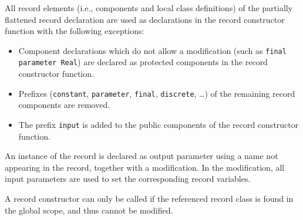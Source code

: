 All record elements (i.e., components and local class definitions) of the partially flattened record declaration are used as declarations in the record constructor function with the following exceptions:
\begin{itemize}
\item
  Component declarations which do not allow a modification (such as \lstinline!final parameter Real!) are declared as protected components in the record constructor function.
\item
  Prefixes (\lstinline!constant!, \lstinline!parameter!, \lstinline!final!, \lstinline!discrete!, \ldots) of the remaining record components are removed.
\item
  The prefix \lstinline!input! is added to the public components of the record constructor function.
\end{itemize}

An instance of the record is declared as output parameter using a name not appearing in the record, together with a modification.
In the modification, all input parameters are used to set the corresponding record variables.

A record constructor can only be called if the referenced record class is found in the global scope, and thus cannot be modified.

